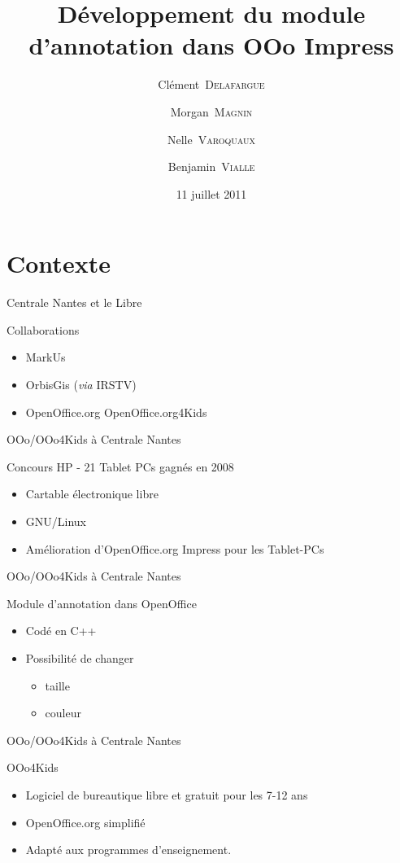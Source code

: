 \documentclass[handout]{beamer}
\title{Développement du module d'annotation dans OOo Impress}
\author{Clément~\textsc{Delafargue} \and Morgan~\textsc{Magnin} \and Nelle~\textsc{Varoquaux}\and Benjamin~\textsc{Vialle}}
\institute[\textsc{ECN}]{École Centrale de Nantes}
\date{11 juillet 2011}
\begin{document}
\frame{\titlepage}

\section{Contexte}

\begin{frame}{Centrale Nantes et le Libre}
    \begin{block}{Collaborations}
	\begin{itemize}[<+->]
	    \item MarkUs
	    \item OrbisGis (\textit{via} IRSTV)
	    \item OpenOffice.org OpenOffice.org4Kids
	\end{itemize}
    \end{block}
\end{frame}

\begin{frame}{OOo/OOo4Kids à Centrale Nantes}
    \begin{block}{Concours HP - 21 Tablet PCs gagnés en 2008}
	\begin{itemize}[<+->]
	    \item Cartable électronique libre
            \item GNU/Linux
            \item Amélioration d'OpenOffice.org Impress pour les Tablet-PCs
	\end{itemize}
    \end{block}
\end{frame}

\begin{frame}{OOo/OOo4Kids à Centrale Nantes}
    \begin{block}{Module d'annotation dans OpenOffice}
	\begin{itemize}
	    \item Codé en C++
	    \item Possibilité de changer
	    \begin{itemize}
		\item taille
		\item couleur
	    \end{itemize}
	\end{itemize}
    \end{block}
\end{frame}

\begin{frame}{OOo/OOo4Kids à Centrale Nantes}
    \begin{block}{OOo4Kids}
	\begin{itemize}[<+->]
	    \item Logiciel de bureautique libre et gratuit pour les 7-12 ans
	    \item OpenOffice.org simplifié
	    \item Adapté aux programmes d'enseignement.
	\end{itemize}
    \end{block}
\end{frame}
\end{document}
